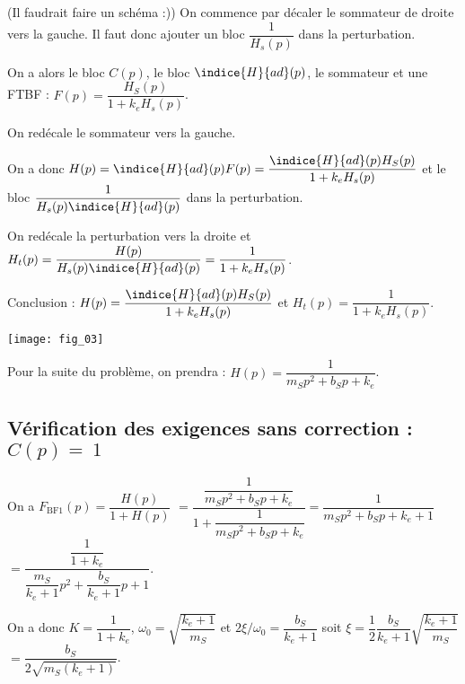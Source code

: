 \begin{multicols}{2}
\ifprof
\begin{corrige} (Il faudrait faire un schéma :))
On commence par décaler le sommateur de droite vers la gauche. Il faut donc ajouter un bloc $\dfrac{1}{H_s(p) }$ dans la perturbation. 

On a alors le bloc $C(p)$, le bloc $\indice{H}{ad}(p)$, le sommateur et une FTBF : $F(p)=\dfrac{H_S(p)}{1+k_eH_s(p)}$.

On redécale le sommateur vers la gauche. 

On a donc $H(p)=\indice{H}{ad}(p) F(p) = \dfrac{ \indice{H}{ad}(p) H_S(p)}{1+k_eH_s(p)}$ et le bloc   $\dfrac{1}{H_s(p) \indice{H}{ad}(p)}$  dans la perturbation. 

On redécale la perturbation vers la droite et $H_t(p)=  \dfrac{H(p)}{H_s(p) \indice{H}{ad}(p)} =  \dfrac{1}{1+k_eH_s(p)}$.

Conclusion : $H(p)= \dfrac{ \indice{H}{ad}(p) H_S(p)}{1+k_eH_s(p)}$ et 
$H_t(p)=  \dfrac{1}{1+k_eH_s(p)}$.
\end{corrige}
\else
\fi


\begin{center}
\texttt{[image: fig\_03]}
\end{center}

Pour la suite du problème, on prendra : $H(p) = \dfrac{1}{m_S p^2 + b_S p + k_e}$.

\subsection*{Vérification des exigences sans correction : $C(p) =~1$}

\ifprof
\begin{corrige}
On a $F_{\text{BF1}}(p) = \dfrac{H(p)}{1+H(p)} $ $=\dfrac{\dfrac{1}{m_S p^2 + b_S p + k_e}}{1+\dfrac{1}{m_S p^2 + b_S p + k_e}} = \dfrac{1}{m_S p^2 + b_S p + k_e+1}$
$= \dfrac{\dfrac{1}{1+k_e}}{\dfrac{m_S}{ k_e+1} p^2 + \dfrac{b_S}{ k_e+1} p +1}$.

On a donc $K  = \dfrac{1}{1+k_e}$, $\omega_0 = \sqrt{\dfrac{k_e+1}{m_S}}$ et $2\xi / \omega_0 = \dfrac{b_S}{ k_e+1}$ soit $\xi = \dfrac{1}{2}\dfrac{b_S}{ k_e+1}  \sqrt{\dfrac{k_e+1}{m_S}} $ $= \dfrac{b_S }{2  \sqrt{m _S(k_e +1) }}$. 


\end{corrige}
\end{multicols}
